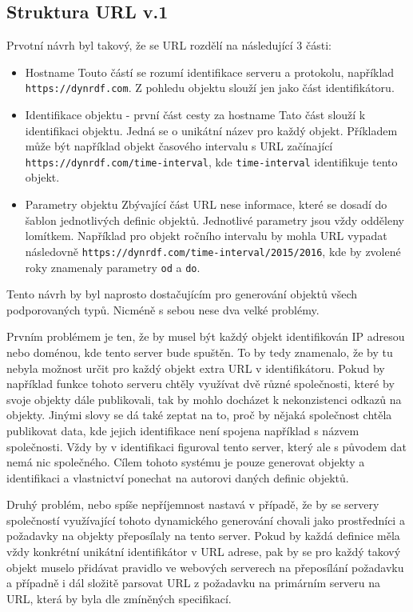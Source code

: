 \documentclass[thesis=B,czech]{FITthesis}[2012/06/26]
\begin{document}
 \subsection{Struktura URL v.1}
 Prvotní návrh byl takový, že se URL rozdělí na následující 3 části:
 \begin{itemize}
  \item Hostname
   \subitem Touto částí se rozumí identifikace serveru a protokolu, například \texttt{https://dynrdf.com}. Z pohledu objektu slouží jen jako část identifikátoru.
\newpage
    \item Identifikace objektu - první část cesty za hostname
     \subitem Tato část slouží k identifikaci objektu. Jedná se o unikátní název pro každý objekt. Příkladem může být například objekt časového intervalu s URL začínající 
     \texttt{https://dynrdf.com/time-interval}, kde \texttt{time-interval} identifikuje tento objekt.
     
    \item Parametry objektu
     \subitem Zbývající část URL nese informace, které se dosadí do šablon jednotlivých definic objektů. Jednotlivé parametry jsou vždy odděleny lomítkem.
     Například pro objekt ročního intervalu by mohla URL vypadat následovně \texttt{https://dynrdf.com/time-interval/2015/2016}, kde by zvolené roky znamenaly 
     parametry \texttt{od} a \texttt{do}.
 \end{itemize}
 Tento návrh by byl naprosto dostačujícím pro generování objektů všech podporovaných typů. Nicméně s sebou nese dva velké problémy.
 
 Prvním problémem je ten, že by musel být každý objekt identifikován IP adresou nebo doménou, kde tento server bude spuštěn. To by tedy znamenalo, že
 by tu nebyla možnost určit pro každý objekt extra URL v identifikátoru. Pokud by například funkce tohoto serveru chtěly využívat dvě různé společnosti, které
 by svoje objekty dále publikovali, tak by mohlo docházet k nekonzistenci odkazů na objekty. Jinými slovy se dá také zeptat na to, proč by nějaká společnost chtěla 
 publikovat data, kde jejich identifikace není spojena například s názvem společnosti. Vždy by v identifikaci figuroval tento server, který ale s původem dat nemá
 nic společného. Cílem tohoto systému je pouze generovat objekty a identifikaci a vlastnictví ponechat na autorovi daných definic objektů.
 
 Druhý problém, nebo spíše nepříjemnost nastavá v případě, že by se servery společností využívající tohoto dynamického generování chovali jako prostředníci 
 a požadavky na objekty přeposílaly na tento server. Pokud by každá definice měla vždy konkrétní unikátní identifikátor v URL adrese, pak by se pro každý takový objekt 
 muselo přidávat pravidlo ve webových serverech na přeposílání požadavku a případně i dál složitě parsovat URL z požadavku na primárním serveru na URL, která by byla 
 dle zmíněných specifikací.
 
\end{document}
